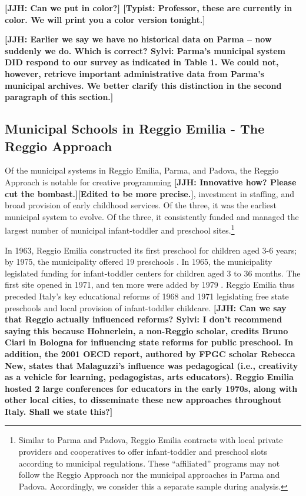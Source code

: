 \textbf{[JJH: Can we put in color?] [Typist: Professor, these are currently in color. We will print you a color version tonight.]}

\textbf{[JJH: Earlier we say we have no historical data on Parma -- now suddenly we do. Which is correct? Sylvi: Parma's municipal system DID respond to our survey as indicated in Table 1. We could not, however, retrieve important administrative data from Parma's municipal archives. We better clarify this distinction in the second paragraph of this section.]}


\subsection{Municipal Schools in Reggio Emilia - The Reggio Approach}

Of the municipal systems in Reggio Emilia, Parma, and Padova, the Reggio Approach is notable for creative programming \textbf{[JJH: Innovative how? Please cut the bombast.][Edited to be more precise.]}, investment in staffing, and broad provision of early childhood services. Of the three, it was the earliest municipal system to evolve. Of the three, it consistently funded and managed the largest number of municipal infant-toddler and preschool sites.\footnote{Similar to Parma and Padova, Reggio Emilia contracts with local private providers and cooperatives to offer infant-toddler and preschool slots according to municipal regulations. These ``affiliated'' programs may not follow the Reggio Approach nor the municipal approaches in Parma and Padova. Accordingly, we consider this a separate sample during analysis.} 

In 1963, Reggio Emilia constructed its first preschool for children aged 3-6 years; by 1975, the municipality offered 19 preschools \citep{Hohnerlein_2009_Paradox-Public-Preschools}. In 1965, the municipality legislated funding for infant-toddler centers for children aged 3 to 36 months. The first site opened in 1971, and ten more were added by 1979 \citep{Cagliari-etal-eds_2016_BOOK_Loris-Malaguzzi}. Reggio Emilia thus preceded Italy's key educational reforms of 1968 and 1971 legislating free state preschools and local provision of infant-toddler childcare. \textbf{[JJH: Can we say that Reggio actually influenced reforms? Sylvi: I don't recommend saying this because Hohnerlein, a non-Reggio scholar, credits Bruno Ciari in Bologna for influencing state reforms for public preschool. In addition, the 2001 OECD report, authored by FPGC scholar Rebecca New, states that Malaguzzi's influence was pedagogical (i.e., creativity as a vehicle for learning, pedagogistas, arts educators). Reggio Emilia hosted 2 large conferences for educators in the early 1970s, along with other local cities, to disseminate these new approaches throughout Italy. Shall we state this?]}

